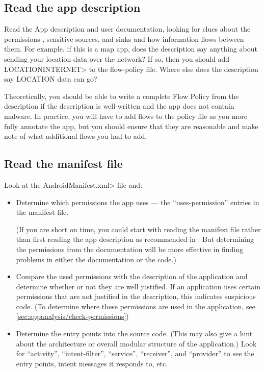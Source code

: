 \subsection{Read the app description}
\label{sec:read-the-app-description}

Read the App description and user documentation, looking for clues about
the permissions , sensitive sources, and sinks and how information
flows between them.  For example,
if this is a map app, does the description say anything about sending your location data over the
 network?  If so, then you should add \<LOCATION\flowsto INTERNET> to the flow-policy file.  Where
else does the description say LOCATION data can go?   

Theoretically, you should be able to write a complete Flow Policy from the
description if the description is well-written and the app does not contain
malware.  In practice, you will have to add flows to the policy file as you
more fully annotate the app, but you should ensure that they are reasonable
and make note of what additional flows you had to add.
 

\subsection{Read the manifest file}

Look at the \<AndroidManifest.xml> file and:
\begin{itemize}
\item Determine which permissions the app uses --- the ``uses-permission''
  entries in the manifest file.

  (If you are short on time, you could start with reading the manifest file
  rather than first reading the app description as recommended in
  .  But determining the permissions
  from the documentation will be more effective in finding problems in
  either the documentation or the code.)
\item Compare the used permissions with the description of the
  application and determine whether or not they are well justified.
  If an application uses certain permissions that are not justified
  in the description, this indicates suspicious code. 
  (To determine where these permissions are used in the application,
   see \ref{sec:appanalysis/check-permissions})


\item Determine the entry points into the source code. (This may also give
  a hint about the architecture or overall modular structure of the
  application.)
  Look for ``activity'', ``intent-filter'', ``service'', ``receiver'', and
  ``provider'' to see the entry points, intent messages it responds to,
  etc.

\end{itemize}



